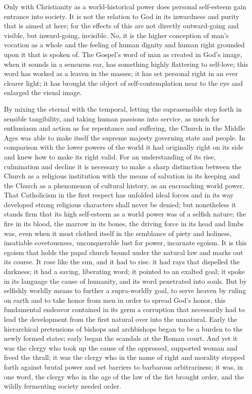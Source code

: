 \documentclass[12pt,a4paper,openany]{book}
\newcommand{\opage}[1]{\marginnote{\footnotesize\textit{[#1]}}}
\begin{document}
Only with Christianity as a world-historical power
does personal self-esteem gain entrance into society.
It is not the relation to God in its inwardness and purity
that is aimed at here; for the effects of this are not directly
outward-going and visible, but inward-going, invisible.
No, it is the higher conception of man's
vocation as a whole and the feeling of human dignity and human right
grounded upon it that is spoken of.
The Gospel's word of man as created in God's image,
when it sounds in a sensuous ear, has something
highly flattering to self-love; this word has worked
as a leaven in the masses; it has set
\setcounter{footnote}{0}%
\opage{298}personal right in an ever clearer light; it has brought the
object of self-contemplation near to the eye and enlarged the visual image.

By mixing the eternal with the temporal, letting
the suprasensible step forth in sensible tangibility,
and taking human passions into service,
as much for enthusiasm and action as for repentance and suffering,
the Church in the Middle Ages was able to make itself
the supreme majesty governing state and people. In comparison
with the lower powers of the world it had originally
right on its side and knew how to make its right valid. For an understanding
of its rise, culmination and decline it is
necessary to make a sharp distinction between the Church
as a religious institution with the means of salvation in its keeping
and the Church as a phenomenon of cultural history, as an encroaching
world power. That Catholicism in the first respect
has unfolded ideal forces and in its way developed strong
religious characters shall never be denied; but nonetheless it
stands firm that its high self-esteem as a world power
was of a selfish nature; the fire in its blood, the marrow in
its bones, the driving force in its head and limbs was, even
when it most clothed itself in the semblance of piety and
holiness, insatiable covetousness, unconquerable lust for power,
incarnate egoism. It is this egoism that
holds the papal church bound under the natural law and marks out
its course. It rose like the sun, and it had to rise.
it had rays that dispelled the darkness; it had a
saving, liberating word; it pointed to an exalted
goal; it spoke in its language the cause of humanity, and
its word penetrated into souls. But by selfishly worldly
means to further a supra-worldly goal, to serve heaven
by ruling on earth and to take honor from
\setcounter{footnote}{0}%
\opage{299}men in order to spread God's honor, this fundamental endeavor
contained in its germ a corruption that necessarily
had to lead the development from the first natural over into
the unnatural. Early the hierarchical pretensions of
bishops and archbishops began to be a burden to the newly formed
states; early began the scandals at the
Roman court. And yet it was the clergy who took
up the cause of the oppressed, supported woman and freed
the thrall; it was the clergy who in the name of right and morality
stepped forth against brutal power and
set barriers to barbarous arbitrariness; it was, in
one word, the clergy who in the age of the law of the fist brought order,
and the wildly fermenting society needed order.
\end{document}
